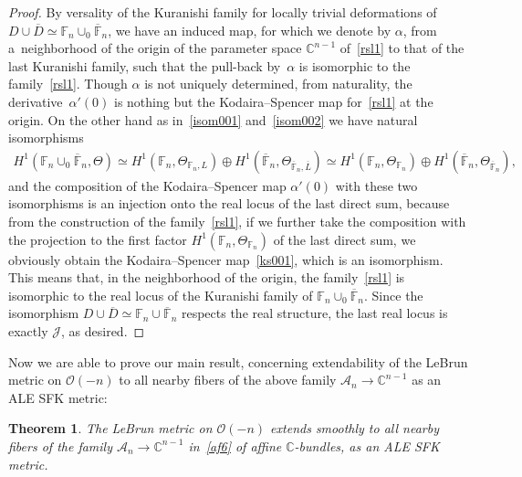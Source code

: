 \documentclass[pdftex]{sigma}
\numberwithin{equation}{section}
\newtheorem{Theorem}{Theorem}[section]
\begin{document}
\begin{proof}
By versality of the Kuranishi family for locally trivial deformations of $D\cup\overline D\simeq\mathbb{F}_n\cup_0
\overline{\mathbb{F}}_n$, we have an induced map, for which we denote by $\alpha$, from a~neighborhood of the origin of
the parameter space $\mathbb{C}^{n-1}$ of~\eqref{rsl1} to that of the last Kuranishi family, such that the pull-back by~$\alpha$ is isomorphic to the family~\eqref{rsl1}.
Though $\alpha$ is not uniquely determined, from naturality, the derivative~$\alpha'(0)$ is nothing but the
Kodaira--Spencer map for~\eqref{rsl1} at the origin.
On the other hand as in~\eqref{isom001} and~\eqref{isom002} we have natural isomorphisms
\begin{gather*}
H^1(\mathbb{F}_n \cup_0 \overline{\mathbb{F}}_n,\Theta) \simeq H^1(\mathbb{F}_n, \Theta_{\mathbb{F}_n,L}) \oplus H^1
(\overline{\mathbb{F}}_n,\Theta_{\overline{\mathbb{F}}_n,\overline L}) \simeq H^1(\mathbb{F}_n, \Theta_{\mathbb{F}_n})
\oplus H^1 (\overline{\mathbb{F}}_n,\Theta_{\overline{\mathbb{F}}_n}),
\end{gather*}
and the composition of the Kodaira--Spencer map $\alpha'(0)$ with these two isomorphisms is an injection onto the real
locus of the last direct sum, because from the construction of the family~\eqref{rsl1}, if we further take the
composition with the projection to the f\/irst factor $H^1(\mathbb{F}_n, \Theta_{\mathbb{F}_n})$ of the last direct sum,
we obviously obtain the Kodaira--Spencer map~\eqref{ks001}, which is an isomorphism.
This means that, in the neighborhood of the origin, the family~\eqref{rsl1} is isomorphic to the real locus of the
Kuranishi family of $\mathbb{F}_n\cup_0\overline{\mathbb{F}}_n$.
Since the isomorphism $D\cup\overline D \simeq \mathbb{F}_n\cup\overline{\mathbb{F}}_n$ respects the real structure, the
last real locus is exactly $\mathscr J$, as desired.
\end{proof}

Now we are able to prove our main result, concerning extendability of the LeBrun metric on $\mathscr O(-n)$ to all
nearby f\/ibers of the above family $\mathscr A_n\to \mathbb{C}^{n-1}$ as an ALE SFK metric:

\begin{Theorem}
\label{thm:main01}
The LeBrun metric on $\mathscr O(-n)$ extends smoothly to all nearby fibers of the family $\mathscr
A_n\to\mathbb{C}^{n-1}$ in~\eqref{af6} of affine $\mathbb{C}$-bundles, as an ALE SFK metric.
\end{Theorem}
\end{document}
